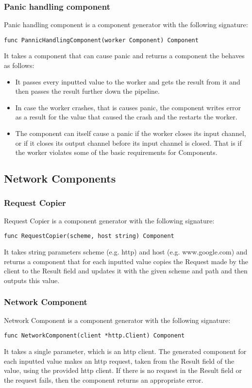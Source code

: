 \documentclass[12pt,a4paper]{article}
\begin{document}
\subsubsection{Panic handling component}
Panic handling component is a component generator with the following signature:

\begin{lstlisting}
func PannicHandlingComponent(worker Component) Component
\end{lstlisting}
It takes a component that can cause panic and returns a component the behaves as follows:
\begin{itemize}
	\item It passes every inputted value to the worker and gets the result from it and then passes
				the result further down the pipeline.
	\item In case the worker crashes, that is causes panic, the component writes error as a result 
				for the value that caused the crash and the restarts the worker.
	\item The component can itself cause a panic if the worker closes its input channel, or if 
				it closes its output channel before its input channel is closed. That is if the worker
				violates some of the basic requirements for Components.
\end{itemize}

\subsection{Network Components}
\subsubsection{Request Copier}
Request Copier is a component generator with the following signature:
\begin{lstlisting}
func RequestCopier(scheme, host string) Component
\end{lstlisting}
It takes string parameters scheme (e.g. http) and host (e.g. www.google.com) 
and returns a component that for each inputted value copies the Request made 
by the client to the Result field and updates it with the given scheme and 
path and then outputs this value.

\subsubsection{Network Component}
Network Component is a component generator with the following signature:
\begin{lstlisting}
func NetworkComponent(client *http.Client) Component
\end{lstlisting}
It takes a single parameter, which is an http client.
The generated component for each inputted value makes an http request,
taken from the Result field of the value, using the provided http client.
If there is no request in the Result field or the request fails, then
the component returns an appropriate error. 
\end{document}
